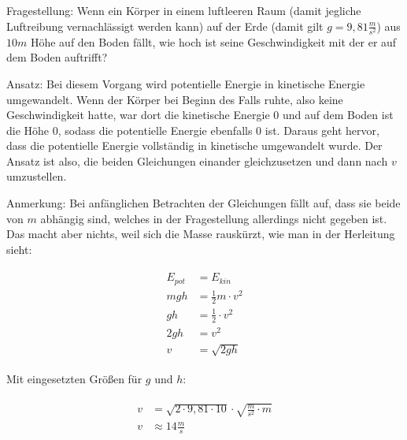 Fragestellung: Wenn ein Körper in einem luftleeren Raum (damit jegliche Luftreibung vernachlässigt werden kann) auf der Erde (damit gilt $g=9,81\frac{m}{s^2}$) aus $10m$ Höhe auf den Boden fällt, wie hoch ist seine Geschwindigkeit mit der er auf dem Boden auftrifft?

Ansatz: Bei diesem Vorgang wird potentielle Energie in kinetische Energie umgewandelt. Wenn der Körper bei Beginn des Falls ruhte, also keine Geschwindigkeit hatte, war dort die kinetische Energie $0$ und auf dem Boden ist die Höhe $0$, sodass die potentielle Energie ebenfalls $0$ ist. Daraus geht hervor, dass die potentielle Energie vollständig in kinetische umgewandelt wurde. Der Ansatz ist also, die beiden Gleichungen einander gleichzusetzen und dann nach $v$ umzustellen.

Anmerkung: Bei anfänglichen Betrachten der Gleichungen fällt auf, dass sie beide von $m$ abhängig sind, welches in der Fragestellung allerdings nicht gegeben ist. Das macht aber nichts, weil sich die Masse \glqq rauskürzt\grqq , wie man in der Herleitung sieht:

\begin{align}
\begin{split}
	E_{pot} &= E_{kin} \\
	mgh &= \frac{1}{2}m \cdot v^2 \\
	gh &= \frac{1}{2} \cdot v^2 \\
	2gh &= v^2 \\
	v &= \sqrt{2gh}
\end{split}
\end{align}

\noindent Mit eingesetzten Größen für $g$ und $h$:

\begin{align}
\begin{split}
	v &= \sqrt{2 \cdot 9,81 \cdot 10} \cdot \sqrt{\frac{m}{s^2} \cdot m} \\
	v &\approx 14 \frac{m}{s}
\end{split}
\end{align}






